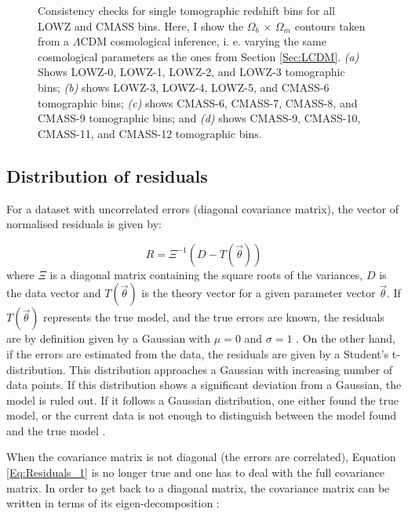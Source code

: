 \begin{figure}
\begin{subfigure}{.5\textwidth}
  \caption{}
\end{subfigure}%
\caption[Consistency checks for single tomographic redshift bins for all LOWZ and CMASS bins using the $\Omega_b\,  \times \, \Omega_{m}$ contours]{Consistency checks for single tomographic redshift bins for all LOWZ and CMASS bins. Here, I show the $\Omega_b\,  \times \, \Omega_{m}$ contours taken from a $\Lambda$CDM cosmological inference, i. e. varying the same cosmological parameters as the ones from Section \ref{Sec:LCDM}. \textit{(a)} Shows LOWZ-0, LOWZ-1, LOWZ-2, and LOWZ-3 tomographic bins; \textit{(b)} shows LOWZ-3, LOWZ-4, LOWZ-5, and CMASS-6 tomographic bins; \textit{(c)} shows CMASS-6, CMASS-7, CMASS-8, and CMASS-9 tomographic bins; and \textit{(d)} shows CMASS-9, CMASS-10, CMASS-11, and CMASS-12 tomographic bins.}
\label{fig:SiingleBinAnaly}
\end{figure}

\subsection{Distribution of residuals}
For a dataset with uncorrelated errors (diagonal covariance matrix), the vector of normalised residuals is given by:

\begin{equation}
R = \Xi^{-1}(D - T(\vec{\theta}))
\label{Eq:Residuals_1}
\end{equation}
where $\Xi$ is a diagonal matrix containing the square roots of the variances, $D$ is the data vector and $T(\vec{\theta})$ is the theory vector for a given parameter vector $\vec{\theta}$. If $T(\vec{\theta})$ represents the true model, and the true errors are known, the residuals are by definition given by a Gaussian with $\mu=0$ and $\sigma=1$ \citep{chisq2010}. On the other hand, if the errors are estimated from the data, the residuals are given by a Student's t-distribution. This distribution approaches a Gaussian with increasing number of data points. If this distribution shows a significant deviation from a Gaussian, the model is ruled out. If it follows a Gaussian distribution, one either found the true model, or the current data is not enough to distinguish between the model found and the true model \citep{chisq2010}.

\qquad When the covariance matrix is not diagonal (the errors are correlated), Equation \eqref{Eq:Residuals_1} is no longer true and one has to deal with the full covariance matrix. In order to get back to a diagonal matrix, the covariance matrix can be written in terms of its eigen-decomposition :

